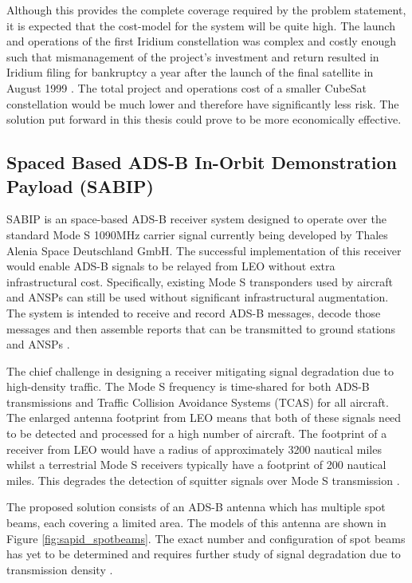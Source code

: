 Although this provides the complete coverage required by the problem statement, it is expected that the cost-model for the system will be quite high. The launch and operations of the first Iridium constellation was complex and costly enough such that mismanagement of the project's investment and return resulted in Iridium filing for bankruptcy a year after the launch of the final satellite in August 1999 \cite{Finkelstein2000}.   The total project and operations cost of a smaller CubeSat constellation would be much lower and therefore have significantly less risk. The solution put forward in this thesis could prove to be more economically effective.

\subsection{Spaced Based ADS-B In-Orbit Demonstration Payload (SABIP)} \label{sec:sadip}
SABIP is an space-based ADS-B receiver system designed to operate over the standard Mode S 1090MHz carrier signal currently being developed by Thales Alenia Space Deutschland GmbH. The successful implementation of this receiver would enable ADS-B signals to be relayed from LEO without extra infrastructural cost. Specifically, existing Mode S transponders used by aircraft and ANSPs can still be used without significant infrastructural augmentation. The system is intended to receive and record ADS-B messages, decode those messages and then assemble reports that can be transmitted to ground stations and ANSPs \cite{Blomenhofer2012}. 

The chief challenge in designing a receiver mitigating signal degradation due to high-density traffic. The Mode S frequency is time-shared for both ADS-B transmissions and Traffic Collision Avoidance Systems (TCAS) for all aircraft. The enlarged antenna footprint from LEO means that both of these signals need to be detected and processed for a high number of aircraft. The footprint of a receiver from LEO would have a radius of approximately 3200 nautical miles whilst a terrestrial Mode S receivers typically have a footprint of 200 nautical miles. This degrades the detection of squitter signals over Mode S transmission \cite{Blomenhofer2012}. 

The proposed solution consists of an ADS-B antenna which has multiple spot beams, each covering a limited area. The models of this antenna are shown in Figure \ref{fig:sapid_spotbeams}. The exact number and configuration of spot beams has yet to be determined and requires further study of signal degradation due to transmission density \cite{Blomenhofer2012}.

